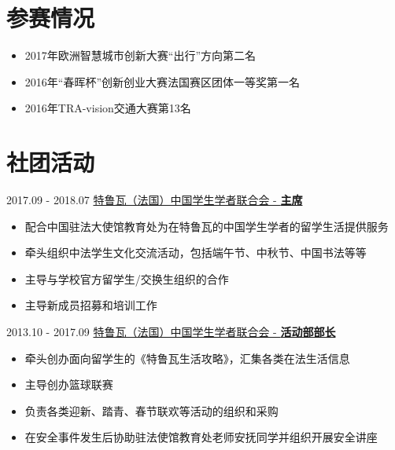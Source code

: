 \documentclass[letterpaper]{twentysecondcv} %
\begin{document}
\section{参赛情况}
\vspace{-0.1cm}
\begin{itemize}
    \item 2017年欧洲智慧城市创新大赛``出行''方向第二名
    \item 2016年``春晖杯''创新创业大赛法国赛区团体一等奖第一名
    \item 2016年TRA-vision交通大赛第13名
\end{itemize}

\section{社团活动}

\begin{twentyfluid}

    \twentyitemfluid
        {2017.09 - 2018.07}
        {}
        {\href{}{特鲁瓦（法国）中国学生学者联合会 - \textbf{主席}}}
        {}
        {
        {
        \vspace{-0.3cm}
        \begin{itemize}
            \item 配合中国驻法大使馆教育处为在特鲁瓦的中国学生学者的留学生活提供服务
            \item 牵头组织中法学生文化交流活动，包括端午节、中秋节、中国书法等等
            \item 主导与学校官方留学生/交换生组织的合作
            \item 主导新成员招募和培训工作
        \end{itemize}}
        }

    \twentyitemfluid
        {2013.10 - 2017.09}
        {}
        {\href{}{特鲁瓦（法国）中国学生学者联合会 - \textbf{活动部部长}}}
        {}
        {
        {
        \vspace{-0.3cm}
        \begin{itemize}
            \item 牵头创办面向留学生的《特鲁瓦生活攻略》，汇集各类在法生活信息
            \item 主导创办篮球联赛
            \item 负责各类迎新、踏青、春节联欢等活动的组织和采购
            \item 在安全事件发生后协助驻法使馆教育处老师安抚同学并组织开展安全讲座
        \end{itemize}}
        }

\end{twentyfluid}
\end{document}
